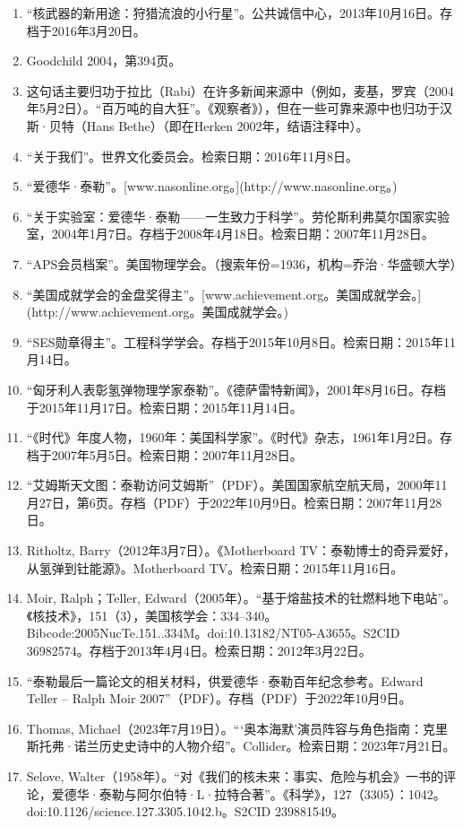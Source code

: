\begin{enumerate}
\item “核武器的新用途：狩猎流浪的小行星”。公共诚信中心，2013年10月16日。存档于2016年3月20日。
\item Goodchild 2004，第394页。
\item 这句话主要归功于拉比（Rabi）在许多新闻来源中（例如，麦基，罗宾（2004年5月2日）。“百万吨的自大狂”。《观察者》），但在一些可靠来源中也归功于汉斯·贝特（Hans Bethe）（即在Herken 2002年，结语注释中）。
\item “关于我们”。世界文化委员会。检索日期：2016年11月8日。
\item “爱德华·泰勒”。[www.nasonline.org。](http://www.nasonline.org。)
\item “关于实验室：爱德华·泰勒——一生致力于科学”。劳伦斯利弗莫尔国家实验室，2004年1月7日。存档于2008年4月18日。检索日期：2007年11月28日。
\item “APS会员档案”。美国物理学会。（搜索年份=1936，机构=乔治·华盛顿大学）
\item “美国成就学会的金盘奖得主”。[www.achievement.org。美国成就学会。](http://www.achievement.org。美国成就学会。)
\item “SES勋章得主”。工程科学学会。存档于2015年10月8日。检索日期：2015年11月14日。
\item “匈牙利人表彰氢弹物理学家泰勒”。《德萨雷特新闻》，2001年8月16日。存档于2015年11月17日。检索日期：2015年11月14日。
\item “《时代》年度人物，1960年：美国科学家”。《时代》杂志，1961年1月2日。存档于2007年5月5日。检索日期：2007年11月28日。
\item “艾姆斯天文图：泰勒访问艾姆斯”（PDF）。美国国家航空航天局，2000年11月27日，第6页。存档（PDF）于2022年10月9日。检索日期：2007年11月28日。
\item Ritholtz, Barry（2012年3月7日）。《Motherboard TV：泰勒博士的奇异爱好，从氢弹到钍能源》。Motherboard TV。检索日期：2015年11月16日。
\item Moir, Ralph；Teller, Edward（2005年）。“基于熔盐技术的钍燃料地下电站”。《核技术》，151（3），美国核学会：334–340。Bibcode:2005NucTe.151..334M。doi:10.13182/NT05-A3655。S2CID 36982574。存档于2013年4月4日。检索日期：2012年3月22日。
\item “泰勒最后一篇论文的相关材料，供爱德华·泰勒百年纪念参考。Edward Teller – Ralph Moir 2007”（PDF）。存档（PDF）于2022年10月9日。
\item Thomas, Michael（2023年7月19日）。“‘奥本海默’演员阵容与角色指南：克里斯托弗·诺兰历史史诗中的人物介绍”。Collider。检索日期：2023年7月21日。
\item Selove, Walter（1958年）。“对《我们的核未来：事实、危险与机会》一书的评论，爱德华·泰勒与阿尔伯特·L·拉特合著”。《科学》，127（3305）：1042。doi:10.1126/science.127.3305.1042.b。S2CID 239881549。

\end{enumerate}
